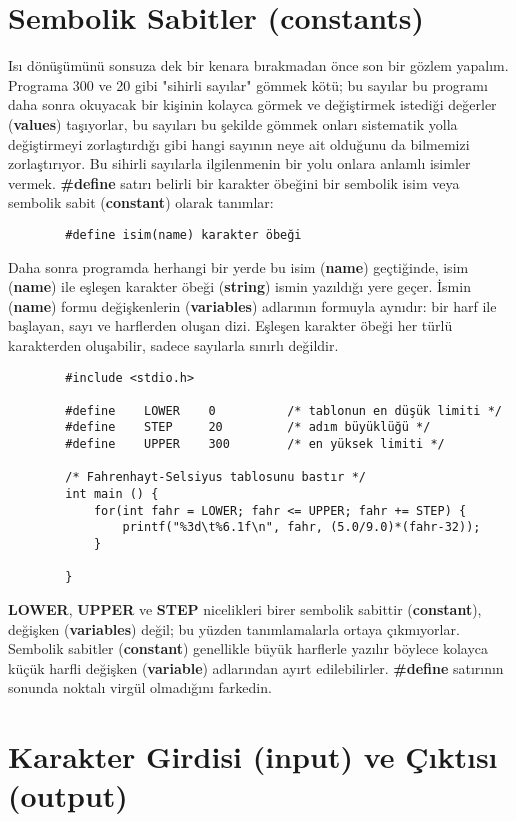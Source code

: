 \documentclass[a4paper,12pt,oneside]{book}
\begin{document}
\section{Sembolik Sabitler (constants)}

\par Isı dönüşümünü sonsuza dek bir kenara bırakmadan önce son bir gözlem yapalım. Programa 300 ve 20 gibi "sihirli sayılar" gömmek kötü; bu sayılar bu programı daha sonra okuyacak bir kişinin kolayca görmek ve değiştirmek istediği değerler (\textbf{values}) taşıyorlar, bu sayıları bu şekilde gömmek onları sistematik yolla değiştirmeyi zorlaştırdığı gibi hangi sayının neye ait olduğunu da bilmemizi zorlaştırıyor. Bu sihirli sayılarla ilgilenmenin bir yolu onlara anlamlı isimler vermek. \textbf{\#define} satırı belirli bir karakter öbeğini bir sembolik isim veya sembolik sabit (\textbf{constant}) olarak tanımlar:
\begin{lstlisting}
		#define isim(name) karakter öbeği
\end{lstlisting}
Daha sonra programda herhangi bir yerde bu isim (\textbf{name}) geçtiğinde, isim (\textbf{name}) ile eşleşen karakter öbeği (\textbf{string}) ismin yazıldığı yere geçer. İsmin (\textbf{name}) formu değişkenlerin (\textbf{variables}) adlarının formuyla aynıdır: bir harf ile başlayan, sayı ve harflerden oluşan dizi. Eşleşen karakter öbeği her türlü karakterden oluşabilir, sadece sayılarla sınırlı değildir.
\begin{lstlisting}
		#include <stdio.h>

		#define    LOWER    0          /* tablonun en düşük limiti */
		#define    STEP     20		   /* adım büyüklüğü */
		#define    UPPER    300        /* en yüksek limiti */

		/* Fahrenhayt-Selsiyus tablosunu bastır */
		int main () {
			for(int fahr = LOWER; fahr <= UPPER; fahr += STEP) {
				printf("%3d\t%6.1f\n", fahr, (5.0/9.0)*(fahr-32));
			}

		}
\end{lstlisting}

\textbf{LOWER}, \textbf{UPPER} ve \textbf{STEP} nicelikleri birer sembolik sabittir (\textbf{constant}), değişken (\textbf{variables}) değil; bu yüzden tanımlamalarla ortaya çıkmıyorlar. Sembolik sabitler (\textbf{constant}) genellikle büyük harflerle yazılır böylece kolayca küçük harfli değişken (\textbf{variable}) adlarından ayırt edilebilirler. \textbf{\#define} satırının sonunda noktalı virgül olmadığını farkedin. \pagebreak

\section{Karakter Girdisi (input) ve Çıktısı (output)}
\end{document}
